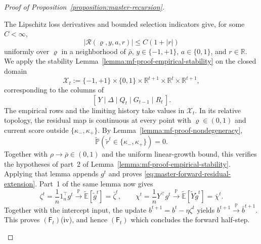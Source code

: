 \begin{proof}[Proof of Proposition~\ref{proposition:master-recursion}]
\begin{enumerate}[wide]
\begin{enumerate}[label=(\alph*),wide]
        The Lipschitz loss derivatives and bounded
        selection indicators give, for some $C<\infty$,
        \[
            |\mathcal R(\varrho,y,a,r)|
            \leq C(1+|r|)
        \]
        uniformly over $\varrho$ in a neighborhood of
        $\bar\rho$, $y\in\{-1,+1\}$,
        $a\in\{0,1\}$, and $r\in\mathbb R$.        
        We apply the stability Lemma~\ref{lemma:mf-proof-empirical-stability} on the closed domain
        \[
            \mathcal X_t
            :=
            \{-1,+1\}\times\{0,1\}
            \times\mathbb R^{t+1}
            \times\mathbb R^t
            \times\mathbb R^{t+1},
        \]
        corresponding to the columns of
        \[
            [\,Y\mid\Delta\mid Q_t\mid G_{t-1}\mid R_t\,].
        \]
        The empirical rows and the limiting history take values
        in $\mathcal X_t$.
        In its relative topology, the residual map is continuous
        at every point with $\varrho\in(0,1)$ and current score
        outside $\{\kappa_-,\kappa_+\}$.
        By Lemma~\ref{lemma:mf-proof-nondegeneracy},
        \[
            \tilde{\mathbb P}
            (\tilde r^t\in\{\kappa_-,\kappa_+\})=0.
        \]
        Together with $\rho\to\bar\rho\in(0,1)$ and the uniform
        linear-growth bound, this verifies the hypotheses of
        part~2 of Lemma~\ref{lemma:mf-proof-empirical-stability}.
        Applying that lemma appends $g^t$ and proves
        \eqref{eq:master-forward-residual-extension}.
        Part~1 of the same lemma now gives
        \[
            \zeta^t
            =
            \frac1n1_n^\top g^t
            \xrightarrow{\mathbb P}
            \tilde{\mathbb E}[\tilde g^t]
            =
            \bar\zeta^t,
            \qquad
            \chi^t
            =
            \frac1nY^\top g^t
            \xrightarrow{\mathbb P}
            \tilde{\mathbb E}[\tilde Y\tilde g^t]
            =
            \bar\chi^t.
        \]
        Together with the intercept input, the update
        \(
            b^{t+1}=b^t-\eta\zeta^t
        \)
        yields
        $b^{t+1}\xrightarrow{\mathbb P}\bar b^{t+1}$.
        This proves $(\mathsf F_t)$(iv), and hence
        $(\mathsf F_t)$ which concludes the forward half-step.
    \end{enumerate}


\end{enumerate}
\end{proof}
